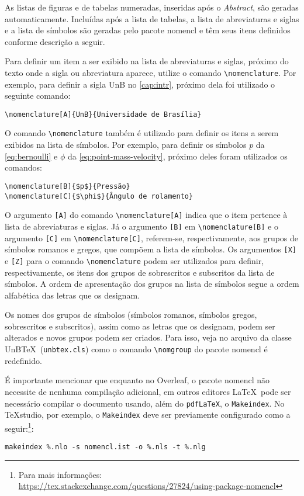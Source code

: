 As listas de figuras e de tabelas numeradas, inseridas após o \emph{Abstract}, são geradas automaticamente. Incluídas após a lista de tabelas, a lista de abreviaturas e siglas e a lista de símbolos são geradas pelo pacote \textsf{nomencl} e têm seus itens definidos conforme descrição a seguir.

Para definir um item a ser exibido na lista de abreviaturas e siglas, próximo do texto onde a sigla ou abreviatura aparece, utilize o comando \verb|\nomenclature|. Por exemplo, para definir a sigla UnB no \cref{cap:intr}, próximo dela foi utilizado o seguinte comando:
\begin{verbatim}
\nomenclature[A]{UnB}{Universidade de Brasília}
\end{verbatim}

O comando \verb|\nomenclature| também é utilizado para definir os itens a serem exibidos na lista de símbolos. Por exemplo, para definir os símbolos $p$ da \cref{eq:bernoulli} e $\phi$ da \cref{eq:point-mass-velocity}, próximo deles foram utilizados os comandos:
\begin{verbatim}
\nomenclature[B]{$p$}{Pressão}
\nomenclature[C]{$\phi$}{Ângulo de rolamento}
\end{verbatim}

O argumento \texttt{[A]} do comando \verb|\nomenclature[A]| indica que o item pertence à lista de abreviaturas e siglas. Já o argumento \texttt{[B]} em \verb|\nomenclature[B]| e o argumento \texttt{[C]} em \verb|\nomenclature[C]|, referem-se, respectivamente, aos grupos de símbolos romanos e gregos, que compõem a lista de símbolos. Os argumentos \texttt{[X]} e \texttt{[Z]} para o comando \verb|\nomenclature| podem ser utilizados para definir, respectivamente, os itens dos grupos de sobrescritos e subscritos da lista de símbolos. A ordem de apresentação dos grupos na lista de símbolos segue a ordem alfabética das letras que os designam.

Os nomes dos grupos de símbolos (símbolos romanos, símbolos gregos, sobrescritos e subscritos), assim como as letras que os designam, podem ser alterados e novos grupos podem ser criados. Para isso, veja no arquivo da classe UnB\TeX\ (\texttt{unbtex.cls}) como o comando \verb|\nomgroup| do pacote \textsf{nomencl} é redefinido.

É importante mencionar que enquanto no Overleaf, o pacote \textsf{nomencl} não necessite de nenhuma compilação adicional, em outros editores \LaTeX\ pode ser necessário compilar o documento usando, além do \texttt{pdfLaTeX}, o \texttt{Makeindex}. No TeXstudio, por exemplo, o \texttt{Makeindex} deve ser previamente configurado como a seguir:\footnote{Para mais informações: \url{https://tex.stackexchange.com/questions/27824/using-package-nomencl}}:
\begin{verbatim}
makeindex %.nlo -s nomencl.ist -o %.nls -t %.nlg
\end{verbatim}

